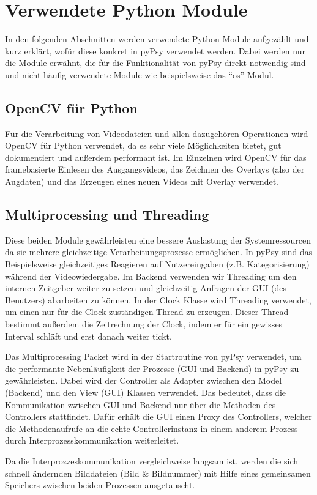 \documentclass[a4paper,draft]{scrartcl}
\begin{document}
\section{Verwendete Python Module}
In den folgenden Abschnitten werden verwendete Python Module aufgezählt und kurz erklärt, wofür diese konkret in pyPsy verwendet werden. Dabei werden nur die Module erwähnt, die für die Funktionalität von pyPsy direkt notwendig sind und nicht häufig verwendete Module wie beispielsweise das "`os"' Modul. 
\subsection{OpenCV für Python}
Für die Verarbeitung von Videodateien und allen dazugehören Operationen wird OpenCV für Python verwendet, da es sehr viele Möglichkeiten bietet, gut dokumentiert und außerdem performant ist. 
Im Einzelnen wird OpenCV für das framebasierte Einlesen des Ausgangsvideos, das Zeichnen des Overlays (also der Augdaten) und das Erzeugen eines neuen Videos mit Overlay verwendet.
\subsection{Multiprocessing und Threading}
Diese beiden Module gewährleisten eine bessere Auslastung der Systemressourcen da sie mehrere gleichzeitige Verarbeitungsprozesse erm\"oglichen. In pyPsy sind das Beispielsweise gleichzeitiges Reagieren auf Nutzereingaben (z.B. Kategorisierung) w\"ahrend der Videowiedergabe.
Im Backend verwenden wir Threading um den internen Zeitgeber weiter zu setzen und gleichzeitig Anfragen der GUI (des Benutzers) abarbeiten zu k\"onnen.
In der Clock Klasse wird Threading verwendet, um einen nur für die Clock zuständigen Thread zu erzeugen. Dieser Thread bestimmt außerdem die Zeitrechnung der Clock, indem er für ein gewisses Interval schläft und erst danach weiter tickt. 

Das Multiprocessing Packet wird in der Startroutine von pyPsy verwendet, um die performante Nebenl\"aufigkeit der Prozesse (GUI und Backend) in pyPsy zu gew\"ahrleisten. Dabei wird der Controller als Adapter zwischen den Model (Backend) und den View (GUI) Klassen verwendet. Das bedeutet, dass die Kommunikation zwischen GUI und Backend nur \"uber die Methoden des Controllers stattfindet. Daf\"ur erh\"alt die GUI einen Proxy des Controllers, welcher die Methodenaufrufe an die echte Controllerinstanz in einem anderem Prozess durch Interprozesskommunikation weiterleitet.

Da die Interprozzeskommunikation vergleichweise langsam ist, werden die sich schnell \"andernden Bilddateien (Bild \& Bildnummer) mit Hilfe eines gemeinsamen Speichers zwischen beiden Prozessen ausgetauscht.
\end{document}
